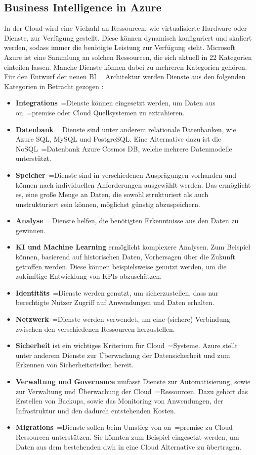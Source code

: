 \subsection{Business Intelligence in Azure} \label{subsec:grundlagen:azure:bi}
In der Cloud wird eine Vielzahl an Ressourcen, wie virtualisierte Hardware oder Dienste, zur Verfügung gestellt. Diese können dynamisch konfiguriert und skaliert werden, sodass immer die benötigte Leistung zur Verfügung steht. Microsoft Azure ist eine Sammlung an solchen Ressourcen, die sich aktuell in 22 Kategorien einteilen lassen. Manche Dienste können dabei zu mehreren Kategorien gehören. Für den Entwurf der neuen BI~=Architektur werden Dienste aus den folgenden Kategorien in Betracht gezogen \cite{chilberto_building_2020}:
\begin{itemize}
\item \textbf{Integrations}~=Dienste können eingesetzt werden, um Daten aus on~=premise oder Cloud Quellsystemen zu extrahieren.
\item \textbf{Datenbank}~=Dienste sind unter anderem relationale Datenbanken, wie Azure SQL, MySQL und PostgreSQL. Eine Alternative dazu ist die NoSQL~=Datenbank Azure Cosmos DB, welche mehrere Datenmodelle unterstützt.
\item \textbf{Speicher}~=Dienste sind in verschiedenen Ausprägungen vorhanden und können nach individuellen Anforderungen ausgewählt werden. Das ermöglicht es, eine große Menge an Daten, die sowohl strukturiert als auch unstrukturiert sein können, möglichst günstig abzuspeichern.
\item \textbf{Analyse}~=Dienste helfen, die benötigten Erkenntnisse aus den Daten zu gewinnen.
\item \textbf{KI und Machine Learning} ermöglicht komplexere Analysen. Zum Beispiel können, basierend auf historischen Daten, Vorhersagen über die Zukunft getroffen werden. Diese können beispielsweise genutzt werden, um die zukünftige Entwicklung von KPIs abzuschätzen.
\item \textbf{Identitäts}~=Dienste werden genutzt, um sicherzustellen, dass nur berechtigte Nutzer Zugriff auf Anwendungen und Daten erhalten.
\item \textbf{Netzwerk}~=Dienste werden verwendet, um eine (sichere) Verbindung zwischen den verschiedenen Ressourcen herzustellen.
\item \textbf{Sicherheit} ist ein wichtiges Kriterium für Cloud~=Systeme. Azure stellt unter anderem Dienste zur Überwachung der Datensicherheit und zum Erkennen von Sicherheitsrisiken bereit.
\item \textbf{Verwaltung und Governance} umfasst Dienste zur Automatisierung, sowie zur Verwaltung und Überwachung der Cloud~=Ressourcen. Dazu gehört das Erstellen von Backups, sowie das Monitoring von Anwendungen, der Infrastruktur und den dadurch entstehenden Kosten.
\item \textbf{Migrations}~=Dienste sollen beim Umstieg von on~=premise zu Cloud Ressourcen unterstützen. Sie könnten zum Beispiel eingesetzt werden, um Daten aus dem bestehenden \ac{dwh} in eine Cloud Alternative zu übertragen.
\end{itemize}

